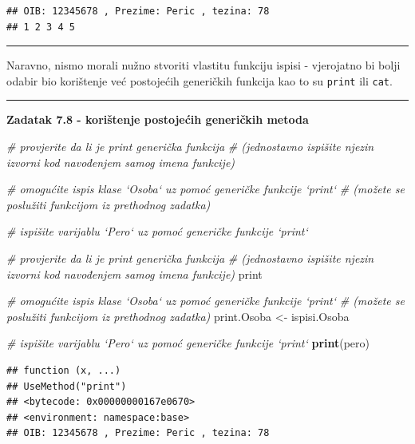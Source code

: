 \documentclass[]{book}
\newenvironment{Shaded}{\begin{snugshade}}{\end{snugshade}}
\newcommand{\KeywordTok}[1]{\textcolor[rgb]{0.13,0.29,0.53}{\textbf{#1}}}
\newcommand{\StringTok}[1]{\textcolor[rgb]{0.31,0.60,0.02}{#1}}
\newcommand{\CommentTok}[1]{\textcolor[rgb]{0.56,0.35,0.01}{\textit{#1}}}
\newcommand{\NormalTok}[1]{#1}
\theoremstyle{definition}
\theoremstyle{definition}
\theoremstyle{definition}
\theoremstyle{remark}
\begin{document}
\begin{verbatim}
## OIB: 12345678 , Prezime: Peric , tezina: 78 
## 1 2 3 4 5
\end{verbatim}

\begin{center}\rule{0.5\linewidth}{\linethickness}\end{center}

Naravno, nismo morali nužno stvoriti vlastitu funkciju ispisi -
vjerojatno bi bolji odabir bio korištenje već postojećih generičkih
funkcija kao to su \texttt{print} ili \texttt{cat}.

\begin{center}\rule{0.5\linewidth}{\linethickness}\end{center}

\textbf{Zadatak 7.8 - korištenje postojećih generičkih metoda}

\begin{Shaded}
\begin{Highlighting}[]
\CommentTok{# provjerite da li je print generička funkcija }
\CommentTok{# (jednostavno ispišite njezin izvorni kod navođenjem samog imena funkcije)}

\CommentTok{# omogućite ispis klase `Osoba` uz pomoć generičke funkcije `print`}
\CommentTok{# (možete se poslužiti funkcijom iz prethodnog zadatka)}

\CommentTok{# ispišite varijablu `Pero` uz pomoć generičke funkcije `print`}
\end{Highlighting}
\end{Shaded}

\begin{Shaded}
\begin{Highlighting}[]
\CommentTok{# provjerite da li je print generička funkcija }
\CommentTok{# (jednostavno ispišite njezin izvorni kod navođenjem samog imena funkcije)}
\NormalTok{print}

\CommentTok{# omogućite ispis klase `Osoba` uz pomoć generičke funkcije `print`}
\CommentTok{# (možete se poslužiti funkcijom iz prethodnog zadatka)}
\NormalTok{print.Osoba <-}\StringTok{ }\NormalTok{ispisi.Osoba}


\CommentTok{# ispišite varijablu `Pero` uz pomoć generičke funkcije `print`}
\KeywordTok{print}\NormalTok{(pero)}
\end{Highlighting}
\end{Shaded}

\begin{verbatim}
## function (x, ...) 
## UseMethod("print")
## <bytecode: 0x00000000167e0670>
## <environment: namespace:base>
## OIB: 12345678 , Prezime: Peric , tezina: 78
\end{verbatim}
\end{document}
